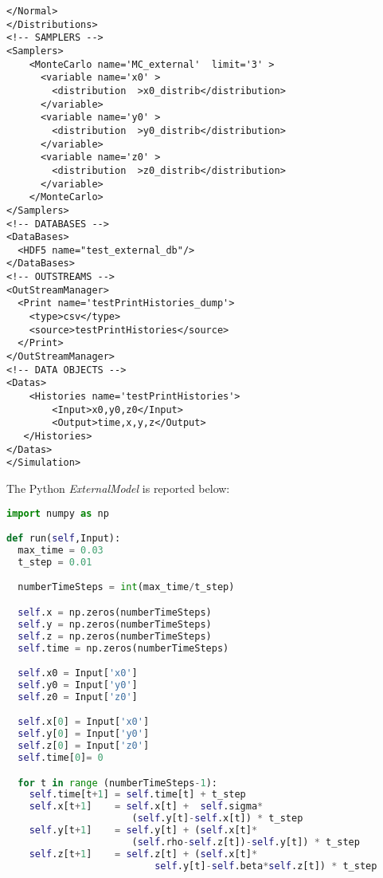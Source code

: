 \begin{lstlisting}[style=XML,morekeywords={debug,re,seeding,class,subType,limit}]
    </Normal>
</Distributions>
<!-- SAMPLERS -->
<Samplers>
    <MonteCarlo name='MC_external'  limit='3' >
      <variable name='x0' >
        <distribution  >x0_distrib</distribution>
      </variable>
      <variable name='y0' >
        <distribution  >y0_distrib</distribution>
      </variable>
      <variable name='z0' >
        <distribution  >z0_distrib</distribution>
      </variable>
    </MonteCarlo>
</Samplers>
<!-- DATABASES -->
<DataBases>
  <HDF5 name="test_external_db"/>
</DataBases>
<!-- OUTSTREAMS -->
<OutStreamManager>
  <Print name='testPrintHistories_dump'>
    <type>csv</type>
    <source>testPrintHistories</source>
  </Print>
</OutStreamManager>
<!-- DATA OBJECTS -->
<Datas>
    <Histories name='testPrintHistories'>
        <Input>x0,y0,z0</Input>
        <Output>time,x,y,z</Output>
   </Histories>
</Datas>
</Simulation>
\end{lstlisting}
The Python \textit{ExternalModel} is reported below:
\begin{lstlisting}[language=python]
import numpy as np

def run(self,Input):
  max_time = 0.03
  t_step = 0.01

  numberTimeSteps = int(max_time/t_step)

  self.x = np.zeros(numberTimeSteps)
  self.y = np.zeros(numberTimeSteps)
  self.z = np.zeros(numberTimeSteps)
  self.time = np.zeros(numberTimeSteps)

  self.x0 = Input['x0']
  self.y0 = Input['y0']
  self.z0 = Input['z0']

  self.x[0] = Input['x0']
  self.y[0] = Input['y0']
  self.z[0] = Input['z0']
  self.time[0]= 0

  for t in range (numberTimeSteps-1):
    self.time[t+1] = self.time[t] + t_step
    self.x[t+1]    = self.x[t] +  self.sigma*
                      (self.y[t]-self.x[t]) * t_step
    self.y[t+1]    = self.y[t] + (self.x[t]*
                      (self.rho-self.z[t])-self.y[t]) * t_step
    self.z[t+1]    = self.z[t] + (self.x[t]*
                          self.y[t]-self.beta*self.z[t]) * t_step
\end{lstlisting}

